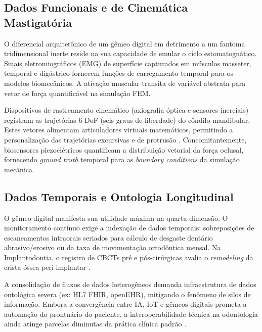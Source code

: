 \subsection{Dados Funcionais e de Cinemática Mastigatória}
\label{subsec:funcionais}

O diferencial arquitetônico de um gêmeo digital em detrimento a um fantoma tridimensional inerte reside na sua capacidade de emular o ciclo estomatognático. Sinais eletromiográficos (EMG) de superfície capturados em músculos masseter, temporal e digástrico fornecem funções de carregamento temporal para os modelos biomecânicos. A ativação muscular transita de variável abstrata para vetor de força quantificável na simulação FEM.

Dispositivos de rastreamento cinemático (axiografia óptica e sensores inerciais) registram as trajetórias 6-DoF (seis graus de liberdade) do côndilo mandibular. Estes vetores alimentam articuladores virtuais matemáticos, permitindo a personalização das trajetórias excursivas e de protrusão \cite{techsoc2025towards}. Concomitantemente, biosensores piezoelétricos quantificam a distribuição vetorial da força oclusal, fornecendo \textit{ground truth} temporal para as \textit{boundary conditions} da simulação mecânica.

\subsection{Dados Temporais e Ontologia Longitudinal}
\label{subsec:temporais}

O gêmeo digital manifesta sua utilidade máxima na quarta dimensão. O monitoramento contínuo exige a indexação de dados temporais: sobreposições de escaneamentos intraorais seriados para cálculo de desgaste dentário abrasivo/erosivo ou da taxa de movimentação ortodôntica mensal. Na Implantodontia, o registro de CBCTs pré e pós-cirúrgicas avalia o \textit{remodeling} da crista óssea peri-implantar \cite{alshadidi2024surface}.

A consolidação de fluxos de dados heterogêneos demanda infraestrutura de dados ontológica severa (ex: HL7 FHIR, openEHR), mitigando o fenômeno de silos de informação. Embora a convergência entre IA, IoT e gêmeos digitais prometa a automação do prontuário do paciente, a interoperabilidade técnica na odontologia ainda atinge parcelas diminutas da prática clínica padrão \cite{mdpi2025digital}.
